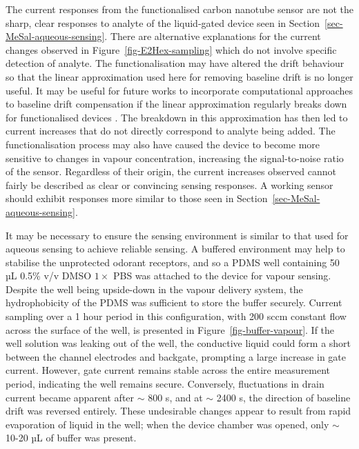\documentclass[
  a4paper,
]{scrbook}
\begin{document}
The current responses from the functionalised carbon nanotube sensor are
not the sharp, clear responses to analyte of the liquid-gated device
seen in Section~\ref{sec-MeSal-aqueous-sensing}. There are alternative
explanations for the current changes observed in
Figure~\ref{fig-E2Hex-sampling} which do not involve specific detection
of analyte. The functionalisation may have altered the drift behaviour
so that the linear approximation used here for removing baseline drift
is no longer useful. It may be useful for future works to incorporate
computational approaches to baseline drift compensation if the linear
approximation regularly breaks down for functionalised devices
\autocite{Zhang2022}. The breakdown in this approximation has then led
to current increases that do not directly correspond to analyte being
added. The functionalisation process may also have caused the device to
become more sensitive to changes in vapour concentration, increasing the
signal-to-noise ratio of the sensor. Regardless of their origin, the
current increases observed cannot fairly be described as clear or
convincing sensing responses. A working sensor should exhibit responses
more similar to those seen in Section~\ref{sec-MeSal-aqueous-sensing}.

It may be necessary to ensure the sensing environment is similar to that
used for aqueous sensing to achieve reliable sensing. A buffered
environment may help to stabilise the unprotected odorant receptors, and
so a PDMS well containing 50 µL 0.5\% v/v DMSO \(1 \times\) PBS was
attached to the device for vapour sensing. Despite the well being
upside-down in the vapour delivery system, the hydrophobicity of the
PDMS was sufficient to store the buffer securely. Current sampling over
a 1 hour period in this configuration, with 200 sccm constant flow
across the surface of the well, is presented in
Figure~\ref{fig-buffer-vapour}. If the well solution was leaking out of
the well, the conductive liquid could form a short between the channel
electrodes and backgate, prompting a large increase in gate current.
However, gate current remains stable across the entire measurement
period, indicating the well remains secure. Conversely, fluctuations in
drain current became apparent after \(\sim\) 800 s, and at \(\sim\) 2400
s, the direction of baseline drift was reversed entirely. These
undesirable changes appear to result from rapid evaporation of liquid in
the well; when the device chamber was opened, only \(\sim\) 10-20 µL of
buffer was present.
\end{document}
